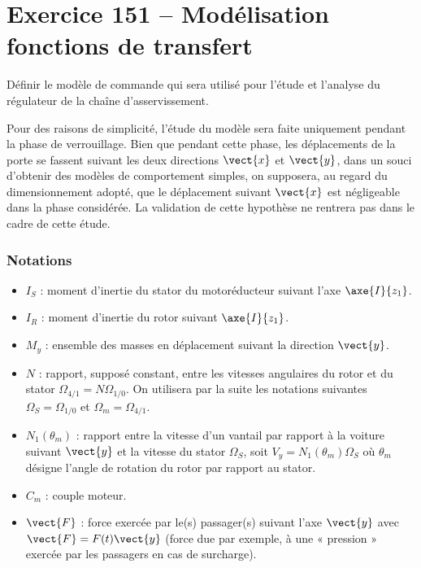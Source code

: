 \section*{Exercice 151 -- Modélisation fonctions de transfert}
\setcounter{exo}{0}


\begin{obj}
Définir le modèle de commande qui sera utilisé pour l’étude et l’analyse
du régulateur de la chaîne d’asservissement.
\end{obj}


Pour des raisons de simplicité, l’étude du modèle sera faite uniquement pendant
la phase de verrouillage. Bien que pendant cette phase, les déplacements de la
porte se fassent suivant les deux directions $\vect{x}$ et $\vect{y}$, dans un souci d’obtenir des
modèles de comportement simples, on supposera, au regard du dimensionnement
adopté, que le déplacement suivant $\vect{x}$ est négligeable dans la phase considérée.
La validation de cette hypothèse ne rentrera pas dans le cadre de cette
étude.



\subsubsection*{Notations}
\begin{itemize}
\item $I_S$ : moment d’inertie du stator du motoréducteur suivant l’axe $\axe{I}{z_1}$.
\item $I_R$ : moment d’inertie du rotor suivant $\axe{I}{z_1}$.
\item $M_y$ : ensemble des masses en déplacement suivant la direction $\vect{y}$.
\item $N$ : rapport, supposé constant, entre les vitesses angulaires du rotor et du stator $\Omega_{4/1}=N\Omega_{1/0}$. On utilisera par la suite les notations suivantes $\Omega_S=\Omega_{1/0}$ et $\Omega_m = \Omega_{4/1}$.
\item $N_1\left(\theta_m\right)$ : rapport entre la vitesse d’un vantail par rapport à la voiture suivant $\vect{y}$ et la vitesse du stator $\Omega_S$, soit $V_y=N_1\left(\theta_m\right)\Omega_S$ où $\theta_m$ désigne l’angle de rotation
du rotor par rapport au stator.
\item $C_m$ : couple moteur.
\item $\vect{F}$ : force exercée par le(s) passager(s) suivant l’axe $\vect{y}$ avec $\vect{F}=F(t)\vect{y} $  (force due
par exemple, à une « pression » exercée par les passagers en cas de surcharge).
\end{itemize}

